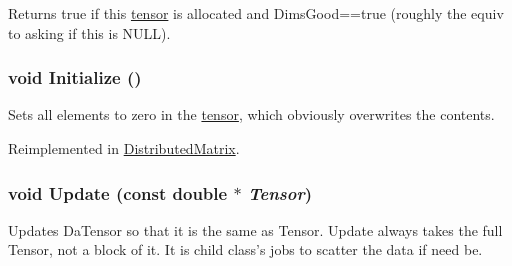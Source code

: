 Returns true if this \hyperlink{classJKBuilder_1_1tensor}{tensor} is allocated and DimsGood==true (roughly the equiv to asking if this is NULL). \hypertarget{classJKBuilder_1_1tensor_a98b1050f09da390896f964fb7a892391}{
\subsubsection[{Initialize}]{\setlength{\rightskip}{0pt plus 5cm}void Initialize ()}}
\label{classJKBuilder_1_1tensor_a98b1050f09da390896f964fb7a892391}


Sets all elements to zero in the \hyperlink{classJKBuilder_1_1tensor}{tensor}, which obviously overwrites the contents. 

Reimplemented in \hyperlink{classJKBuilder_1_1DistributedMatrix_a98b1050f09da390896f964fb7a892391}{DistributedMatrix}.\hypertarget{classJKBuilder_1_1tensor_a10ffea2bf428adfa3e8319646c44a3c6}{
\subsubsection[{Update}]{\setlength{\rightskip}{0pt plus 5cm}void Update (const double $\ast$ {\em Tensor})}}
\label{classJKBuilder_1_1tensor_a10ffea2bf428adfa3e8319646c44a3c6}


Updates DaTensor so that it is the same as Tensor. Update always takes the full Tensor, not a block of it. It is child class's jobs to scatter the data if need be. 


